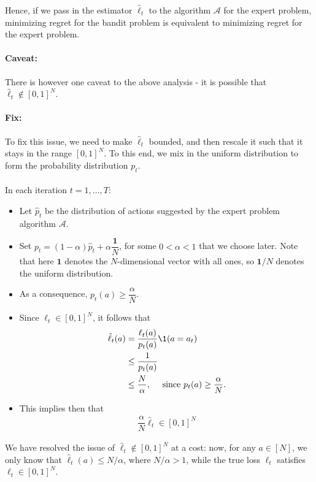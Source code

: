 \documentclass[11pt]{article}
\begin{document}
Hence, if we pass in the estimator $\hat{\ell}_t$ to the algorithm $\mathcal{A}$ for the expert problem, minimizing regret for the bandit problem is equivalent to minimizing regret for the expert problem.

\paragraph{Caveat:}There is however one caveat to the above analysis - it is possible that $\hat{\ell}_t \notin [0,1]^N$.

\paragraph{Fix:}To fix this issue, we need to make $\hat{\ell}_t$ bounded, and then rescale it such that it stays in the range $[0,1]^N$. To this end, we mix in the uniform distribution to form the probability distribution $p_t$. 

\paragraph{}
In each iteration $t = 1,\dots,T$:
\begin{itemize}
    \item Let $\hat{p}_t$ be the distribution of actions suggested by the expert problem algorithm $\mathcal{A}$.
    \item Set $p_t = (1 - \alpha) \hat{p}_t + \alpha \dfrac{\mathbf{1}}{N}$, for some $0 < \alpha < 1 $ that we choose later. Note that here $\mathbf{1}$ denotes the $N$-dimensional vector with all ones, so $\mathbf{1}/N$ denotes the uniform distribution. 
    \item As a consequence, $p_t(a) \geq \dfrac{\alpha}{N}$.
    \item Since $\ell_t \in [0,1]^N$, it follows that
    \begin{align*}
        \hat{\ell}_t(a) &= \dfrac{\ell_t(a)}{p_t(a)} \1(a = a_t) \\
        &\leq \dfrac{1}{p_t(a)} \\
        &\leq \dfrac{N}{\alpha}, \quad \mbox{ since }p_t(a) \geq \dfrac{\alpha}{N}.
    \end{align*}
    \item This implies then that 
    \begin{gather*}
        \dfrac{\alpha}{N} \hat{\ell}_t \in [0,1]^N
    \end{gather*}
\end{itemize}
We have resolved the issue of $\hat{\ell}_t \notin [0,1]^N$ at a cost: now, for any $a \in [N]$, we only know that $\hat{\ell}_t(a) \leq N/\alpha$, where $N/\alpha > 1$, while the true loss $\ell_t$ satisfies $\ell_t \in [0,1]^N.$
\end{document}
